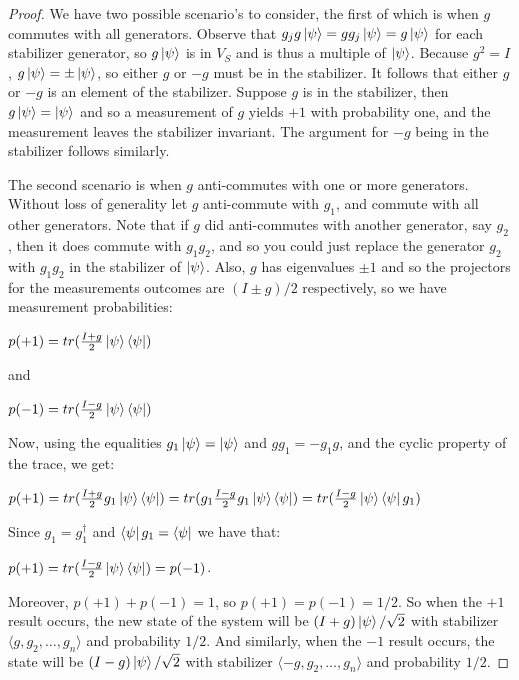 \documentclass[12pt]{dalthesis}
\begin{document}
\begin{proof}
We have two possible scenario's to consider, the first of which is when $g$ commutes with all generators. Observe that $g_jg\ket{\psi} = gg_j\ket{\psi} = g\ket{\psi}$ for each stabilizer generator, so $g\ket{\psi}$ is in $V_S$ and is thus a multiple of $\ket{\psi}$. Because $g^2 = I$, $g\ket{\psi} = \pm\ket{\psi}$, so either $g$ or $-g$ must be in the stabilizer. It follows that either $g$ or $-g$ is an element of the stabilizer. Suppose $g$ is in the stabilizer, then $g\ket{\psi} = \ket{\psi}$ and so a measurement of $g$ yields $+1$ with probability one, and the measurement leaves the stabilizer invariant. The argument for $-g$ being in the stabilizer follows similarly.

The second scenario is when $g$ anti-commutes with one or more generators. Without loss of generality let $g$ anti-commute with $g_1$, and commute with all other generators. Note that if $g$ did anti-commutes with another generator, say $g_2$, then it does commute with $g_1g_2$, and so you could just replace the generator $g_2$ with $g_1g_2$ in the stabilizer of $\ket{\psi}$. Also, $g$ has eigenvalues $\pm 1$ and so the projectors for the measurements outcomes are $(I \pm g)/2$ respectively, so we have measurement probabilities:
\begin{center}
$p(+1) = tr(\frac{I+g}{2}\ket{\psi}\bra{\psi})$
\end{center}
and 
\begin{center}
$p(-1) = tr(\frac{I-g}{2}\ket{\psi}\bra{\psi})$
\end{center}
Now, using the equalities $g_1\ket{\psi} = \ket{\psi}$ and $gg_1 = -g_1g$, and the cyclic property of the trace, we get:
\begin{center}
$p(+1) = tr(\frac{I+g}{2}g_1\ket{\psi}\bra{\psi}) = tr(g_1\frac{I-g}{2}g_1\ket{\psi}\bra{\psi}) = tr(\frac{I-g}{2}\ket{\psi}\bra{\psi}g_1)$
\end{center}
Since $g_1 = g_1^{\dag}$ and $\bra{\psi}g_1 = \bra{\psi}$ we have that:
\begin{center}
$p(+1) = tr(\frac{I-g}{2}\ket{\psi}\bra{\psi}) = p(-1)$.
\end{center}
Moreover, $p(+1) + p(-1) = 1$, so $p(+1) = p(-1) = 1/2$. So when the $+1$ result occurs, the new state of the system will be $(I + g)\ket{\psi}/\sqrt{2}$ with stabilizer $\langle g, g_2, \dots , g_n \rangle$ and probability $1/2$. And similarly, when the $-1$ result occurs, the state will be $(I - g)\ket{\psi}/\sqrt{2}$ with stabilizer $\langle -g, g_2, \dots , g_n \rangle$ and probability $1/2$.
\end{proof}
\end{document}
